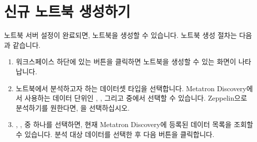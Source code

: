 \documentclass[letterpaper,10pt,english]{sphinxmanual}
\begin{document}
\section{신규 노트북 생성하기}
\label{\detokenize{discovery/part05/create_a_notebook:id1}}\label{\detokenize{discovery/part05/create_a_notebook::doc}}
노트북 서버 설정이 완료되면, 노트북을 생성할 수 있습니다. 노트북 생성 절차는 다음과 같습니다.
\begin{enumerate}
\def\theenumi{\arabic{enumi}}
\def\labelenumi{\theenumi .}
\makeatletter\def\p@enumii{\p@enumi \theenumi .}\makeatother
\item {} 
워크스페이스 하단에 있는  버튼을 클릭하면 노트북을 생성할 수 있는 화면이 나타납니다.
\begin{quote}

\begin{figure}[H]
\centering

\noindent{}
\end{figure}
\end{quote}

\item {} 
노트북에서 분석하고자 하는 데이터셋 타입을 선택합니다. Metatron Discovery에서 사용하는 데이터 단위인 , ,  그리고  중에서 선택할 수 있습니다. Zeppelin으로 분석하기를 원한다면, 을 선택하십시오.
\begin{quote}

\begin{figure}[H]
\centering

\noindent{}
\end{figure}
\end{quote}

\item {} 
, ,  중 하나를 선택하면, 현재 Metatron Discovery에 등록된 데이터 목록을 조회할 수 있습니다. 분석 대상 데이터를 선택한 후 다음 버튼을 클릭합니다.
\begin{quote}

\begin{figure}[H]
\centering

\noindent{}
\end{figure}
\end{quote}


\end{enumerate}
\end{document}
